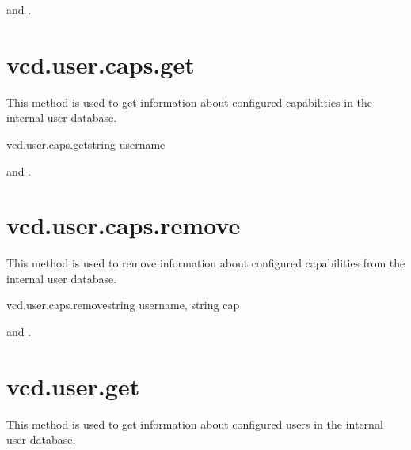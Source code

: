 \begin{rpcaccess}
 and \rpcnoownerchecks.
\end{rpcaccess}

\rpcreturnnil

\rpcnoerrors


\section{vcd.user.caps.get}

This method is used to get information about configured capabilities in the
internal user database.

\begin{rpcsynopsis}{vcd.user.caps.get}{string username}
\end{rpcsynopsis}

\begin{rpcaccess}
 and \rpcnoownerchecks.
\end{rpcaccess}


\rpcnoerrors


\section{vcd.user.caps.remove}

This method is used to remove information about configured capabilities from
the internal user database.

\begin{rpcsynopsis}{vcd.user.caps.remove}{string username, string cap}
\end{rpcsynopsis}

\begin{rpcaccess}
 and \rpcnoownerchecks.
\end{rpcaccess}

\rpcreturnnil

\rpcnoerrors


\section{vcd.user.get}

This method is used to get information about configured users in the internal
user database.


